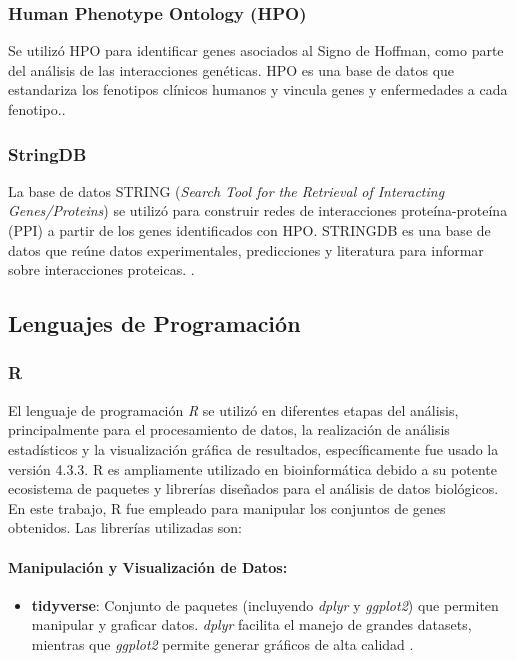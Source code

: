 \subsubsection{Human Phenotype Ontology (HPO)}
 Se utilizó HPO para identificar genes asociados al Signo de Hoffman, como parte del análisis de las interacciones genéticas. HPO es una base de datos que estandariza los fenotipos clínicos humanos y vincula genes y enfermedades a cada fenotipo.\cite{gargano2024}.

\subsubsection{StringDB}
La base de datos STRING (\textit{Search Tool for the Retrieval of Interacting Genes/Proteins}) se utilizó para construir redes de interacciones proteína-proteína (PPI) a partir de los genes identificados con HPO. STRINGDB es una base de datos que reúne datos experimentales, predicciones y literatura para informar sobre interacciones proteicas. \cite{szklarczyk2019}.

\subsection{Lenguajes de Programación}

\subsubsection{R}
El lenguaje de programación \textit{R} se utilizó en diferentes etapas del análisis, principalmente para el procesamiento de datos, la realización de análisis estadísticos y la visualización gráfica de resultados, específicamente fue usado la versión 4.3.3. R es ampliamente utilizado en bioinformática debido a su potente ecosistema de paquetes y librerías diseñados para el análisis de datos biológicos\cite{chan2018}. En este trabajo, R fue empleado para manipular los conjuntos de genes obtenidos. Las librerías utilizadas son:


\paragraph{Manipulación y Visualización de Datos:}
\begin{itemize}
	\item \textbf{tidyverse}: Conjunto de paquetes (incluyendo \textit{dplyr} y \textit{ggplot2}) que permiten manipular y graficar datos. \textit{dplyr} facilita el manejo de grandes datasets, mientras que \textit{ggplot2} permite generar gráficos de alta calidad \cite{Wickham2019}.
\end{itemize}

